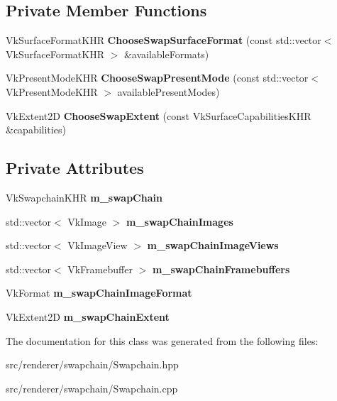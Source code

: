 \subsection*{Private Member Functions}
\begin{DoxyCompactItemize}
\item 
\mbox{\label{class_flounder_1_1_swapchain_a03ec5af3842787e42f8ca63cf0d46650}} 
Vk\+Surface\+Format\+K\+HR {\bfseries Choose\+Swap\+Surface\+Format} (const std\+::vector$<$ Vk\+Surface\+Format\+K\+HR $>$ \&available\+Formats)
\item 
\mbox{\label{class_flounder_1_1_swapchain_a21ddec3e6644fa1eb1e139c6844c4315}} 
Vk\+Present\+Mode\+K\+HR {\bfseries Choose\+Swap\+Present\+Mode} (const std\+::vector$<$ Vk\+Present\+Mode\+K\+HR $>$ available\+Present\+Modes)
\item 
\mbox{\label{class_flounder_1_1_swapchain_a31610e19a8032281180f34409b794929}} 
Vk\+Extent2D {\bfseries Choose\+Swap\+Extent} (const Vk\+Surface\+Capabilities\+K\+HR \&capabilities)
\end{DoxyCompactItemize}
\subsection*{Private Attributes}
\begin{DoxyCompactItemize}
\item 
\mbox{\label{class_flounder_1_1_swapchain_a9db8e5429e8219e251ceed97ad035154}} 
Vk\+Swapchain\+K\+HR {\bfseries m\+\_\+swap\+Chain}
\item 
\mbox{\label{class_flounder_1_1_swapchain_a19a98b44a56d330912932602b881d960}} 
std\+::vector$<$ Vk\+Image $>$ {\bfseries m\+\_\+swap\+Chain\+Images}
\item 
\mbox{\label{class_flounder_1_1_swapchain_aa5cbbac9ff271922bc1f269f0e7aec8c}} 
std\+::vector$<$ Vk\+Image\+View $>$ {\bfseries m\+\_\+swap\+Chain\+Image\+Views}
\item 
\mbox{\label{class_flounder_1_1_swapchain_a4be15b4ec7cdb4d6df8440521660ae2b}} 
std\+::vector$<$ Vk\+Framebuffer $>$ {\bfseries m\+\_\+swap\+Chain\+Framebuffers}
\item 
\mbox{\label{class_flounder_1_1_swapchain_a1ad056b9049893acfb3b2ba1ce1fce5e}} 
Vk\+Format {\bfseries m\+\_\+swap\+Chain\+Image\+Format}
\item 
\mbox{\label{class_flounder_1_1_swapchain_a37ce718aa6dc3c8cf0aca772b6d45497}} 
Vk\+Extent2D {\bfseries m\+\_\+swap\+Chain\+Extent}
\end{DoxyCompactItemize}


The documentation for this class was generated from the following files\+:\begin{DoxyCompactItemize}
\item 
src/renderer/swapchain/Swapchain.\+hpp\item 
src/renderer/swapchain/Swapchain.\+cpp\end{DoxyCompactItemize}
